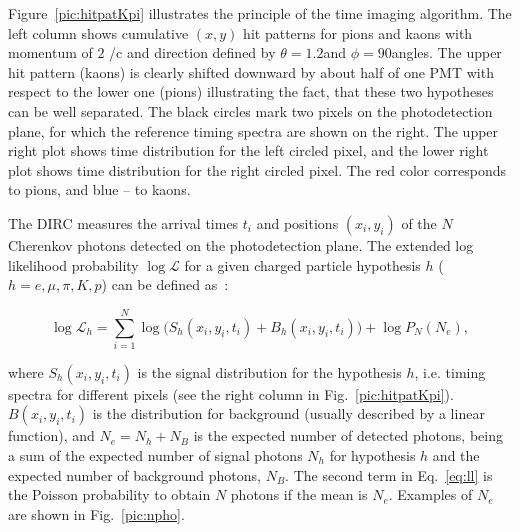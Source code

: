 Figure~\ref{pic:hitpatKpi} illustrates the principle of the time imaging  algorithm. The left column shows cumulative $(x, y)$ hit patterns for pions and kaons with momentum of $2$ {\gev}/c and direction defined by $\theta = 1.2$\mydeg and $\phi = 90$\mydeg angles. The upper hit pattern (kaons) is clearly shifted downward by about half of one PMT with respect to the lower one (pions) illustrating the fact, that these two hypotheses can be well separated. The black circles mark two pixels on the photodetection plane, for which the reference timing spectra are shown on the right. The upper right plot shows time distribution for the left circled pixel, and the lower right plot shows time distribution for the right circled pixel. The red color corresponds to pions, and blue -- to kaons.
 
The DIRC measures the arrival times $t_{i}$ and positions $(x_{i}, y_{i})$ of the $N$ Cherenkov photons detected on the photodetection plane. The extended log likelihood probability $\log\mathcal{L}$ for a given charged particle hypothesis $h$ ($h = e, \mu, \pi, K, p$) can be 
defined as~\cite{staric2}:

\begin{equation}
\log\mathcal{L}_{h} = \sum_{i=1}^{N} \log \Big( S_{h}(x_{i}, y_{i}, t_{i}) + B_{h}(x_{i}, y_{i}, t_{i}) \Big) + \log P_{N}(N_{e}),
\label{eq:ll}
\end{equation}

\noindent where $S_{h} (x_{i}, y_{i}, t_{i})$ is the signal distribution for the hypothesis $h$, i.e. timing spectra for different pixels (see the right column in Fig.~\ref{pic:hitpatKpi}). $B(x_{i}, y_{i}, t_{i})$ is the distribution for background (usually described by a linear function), and $N_{e} = N_{h} + N_{B}$ is the expected number of detected photons, being a sum of the expected number of signal photons $N_{h}$ for hypothesis $h$ and the expected number of background photons, $N_{B}$. The second term in Eq.~\ref{eq:ll} is the Poisson probability to obtain $N$ photons if the mean is $N_{e}$.
Examples of $N_{e}$ are shown in Fig.~\ref{pic:npho}.

